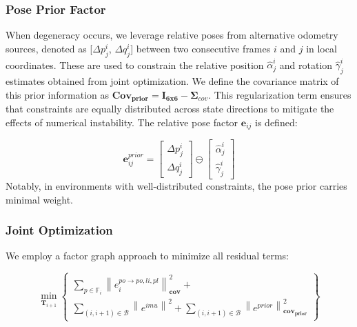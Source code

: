 
\subsubsection{Pose Prior Factor}
When degeneracy occurs, we leverage relative poses from alternative odometry sources, denoted as [$\Delta p_j^i$, $\Delta q_j^i$] between two consecutive frames $i$ and $j$ in local coordinates. These are used to constrain the relative position $\hat \alpha _j^i$ and rotation $\hat \gamma _j^i$ estimates obtained from joint optimization. We define the covariance matrix of this prior information as $\mathbf{Cov_{prior}}=\mathbf{I_{6x6}}-\boldsymbol{\Sigma}_{cov}$. This regularization term ensures that constraints are equally distributed across state directions to mitigate the effects of numerical instability.
The relative pose factor $\mathbf{e}_{i j}$ is defined:

\begin{equation}
\mathbf{e}_{i j}^{prior}=\left[ {\begin{array}{*{20}{c}}
{\Delta p_j^i}\\
{\Delta q_j^i}
\end{array}} \right] \ominus \left[ {\begin{array}{*{20}{c}}
{\hat \alpha _j^i}\\
{\hat \gamma _j^i}
\end{array}} \right]
\end{equation}
Notably, in environments with well-distributed constraints, the pose prior carries minimal weight.
\subsubsection{Joint Optimization}

We employ a factor graph approach to minimize all residual terms:

\begin{equation}
\mathop {\min }\limits_{{\mathbf{T}_{i + 1}}} \left\{ {\left. {\begin{array}{*{20}{c}}
{\sum\limits_{p \in {\mathbb{F}_{i}}} {{{\left\| {e_i^{po \to po,li,pl}} \right\|}_{\mathbf{cov}}^2} + } }\\
{\sum\limits_{\left( {i,i + 1} \right) \in \mathcal{B} } {{{\left\| {{e^{imu}}} \right\|}^2} }+\sum\limits_{\left( {i,i + 1} \right) \in \mathcal{B} } {{{\left\| {{e^{prior}}} \right\|}_{\mathbf{cov_{prior}}}^2}}}
\end{array}} \right\}} \right.
\label{eq:pgo_eqn}
\end{equation}

